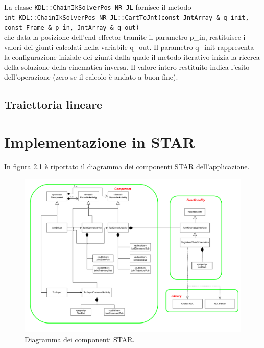 La classe \texttt{KDL::ChainIkSolverPos\_NR\_JL} fornisce il metodo \\
\texttt{int KDL::ChainIkSolverPos\_NR\_JL::CartToJnt(const JntArray \&\ q\_init, const Frame \&\ p\_in, JntArray \&\	q\_out)} \\ che data la posizione dell'end-effector tramite il parametro p\_in, restituisce i valori dei giunti calcolati nella variabile q\_out. Il parametro q\_init rappresenta la configurazione iniziale dei giunti dalla quale il metodo iterativo inizia la ricerca della soluzione della cinematica inversa. Il valore intero restituito indica l'esito dell'operazione (zero se il calcolo è andato a buon fine).

\section{Traiettoria lineare}

\chapter{Implementazione in STAR} 

In figura \ref{fig:star_diagram} è riportato il diagramma dei componenti STAR dell'applicazione. 

\begin{figure}[tbh]
	\centering
	\includegraphics[width=1\linewidth]{./ImageFiles/publish_subscribe_architecture.drawio.pdf}
	\caption{Diagramma dei componenti STAR.}
	\label{fig:star_diagram}
\end{figure}

